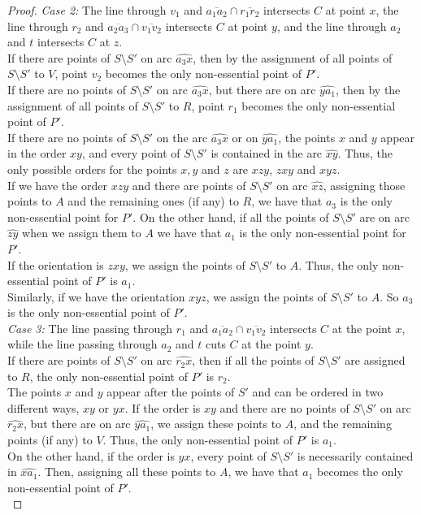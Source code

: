 \documentclass[11pt,a4paper]{article}
\theoremstyle{plain}
\theoremstyle{definition}
\begin{document}
\begin{proof}
\noindent\emph{Case 2:}
The line through $v_1$ and $\overline{a_1 a_2} \cap \overline{r_1 r_2}$ intersects $C$ at point $x$, the line through $r_2$ and $\overline{a_2 a_3} \cap \overline{v_1 v_2}$ intersects $C$ at point $y$, and the line through $a_2$ and $t$ intersects $C$ at $z$.\\
If there are points of $S\setminus S'$ on arc $\widehat{a_3x}$, then by the assignment of all points of $S\setminus S'$ to $V$, point $v_2$ becomes the only non-essential point of $P'$.\\
If there are no points of $S\setminus S'$ on arc $\widehat{a_3x}$, but there are on arc $\widehat{ya_1}$, then by the assignment of all points of $S\setminus S'$ to $R$, point $r_1$ becomes the only non-essential point of $P'$.\\
If there are no points of $S\setminus S'$ on the arc $\widehat{a_3x}$ or on $\widehat{ya_1}$, the points $x$ and $y$ appear in the order $xy$, and every point of $S\setminus S'$ is contained in the arc $\widehat{xy}$. Thus, the only possible orders for the points $x,y$ and $z$ are $xzy$, $zxy$ and $xyz$. \\
If we have the order $xzy$ and there are points of $S\setminus S'$ on arc $\widehat{xz}$, assigning those points to $A$ and the remaining ones (if any) to $R$, we have that $a_3$ is the only non-essential point for $P'$. On the other hand, if all the points of $S\setminus S'$ are on arc $\widehat{zy}$ when we assign them to $A$ we have that $a_1$ is the only non-essential point for $P'$. \\
If the orientation is $zxy$, we assign the points of $S\setminus S'$ to $A$. Thus, the only non-essential point of $P'$ is $a_1$. \\
Similarly, if we have the orientation $xyz$, we assign the points of $S\setminus S'$ to $A$. So $a_3$ is the only non-essential point of $P'$.\\

\noindent\emph{Case 3:} 
The line passing through $r_1$ and $\overline{a_1 a_2} \cap \overline{v_1 v_2}$ intersects $C$ at the point $x$, while the line passing through $a_2$ and $t$ cuts $C$ at the point $y$.\\
If there are points of $S\setminus S'$ on arc $\widehat{r_2x}$, then if all the points of $S\setminus S'$ are assigned to $R$, the only non-essential point of $P'$ is $r_2$.\\
The points $x$ and $y$ appear after the points of $S'$ and can be ordered in two different ways, $xy$ or $yx$.
If the order is $xy$ and there are no points of $S\setminus S'$ on arc $\widehat{r_2x}$, but there are on arc $\widehat{ya_1}$, we assign these points to $A$, and the remaining points (if any) to $V$. Thus, the only non-essential point of $P'$ is $a_1$.\\
On the other hand, if the order is $yx$, every point of $S\setminus S'$ is necessarily contained in $\widehat{xa_1}$. Then, assigning all these points to $A$, we have that $a_1$ becomes the only non-essential point of $P'$.\\



\end{proof}
\end{document}
